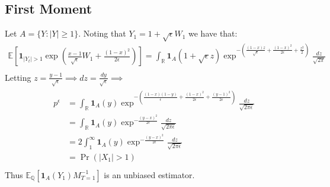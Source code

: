 \documentclass[11pt]{amsart}
\newcommand{\want}{p^{\epsilon}}
\newcommand{\noise}{\sqrt{\epsilon}}
\begin{document}
\subsection{First Moment}
Let $ A = \{ Y : |Y| \geq 1 \}$. Noting that $Y_1 = 1 + \sqrt{\epsilon}W_1$ we have that: 
\begin{align}
  \mathbb{E}\left [ \mathbf{1}_{ |Y_t| > 1 } \exp \left (
     \frac{x-1}{\noise} W_1 +\frac{(1-x)^2}{2\epsilon} \right ) \right ] =
   \int_{\mathbb{R}} \mathbf{1}_{A}(1+\sqrt{\epsilon}z)\exp^{-(\frac{(1-x)z}{\sqrt{\epsilon}}+\frac{(1-x)^2}{2\epsilon}+\frac{z^2}{2})} \frac{dz}{\sqrt{2\pi}} \\
\end{align}
Letting $z = \frac{y-1}{\sqrt{\epsilon}} \implies dz = \frac{dy}{\sqrt{\epsilon}} \implies $ 
\begin{align}
  \begin{split}
  \want &= \int_{\mathbb{R}} \mathbf{1}_{A}(y)\exp^{-(\frac{(1-x)(1-y)}{\epsilon}+\frac{(1-x)^2}{2\epsilon}+\frac{(y-1)^2}{2\epsilon})} \frac{dz}{\sqrt{2\pi\epsilon}} \\
  &= \int_{\mathbb{R}} \mathbf{1}_{A}(y)\exp^{-\frac{(y-x)^2}{2\epsilon}} \frac{dz}{\sqrt{2\pi\epsilon}} \\
  &= 2\int_{1}^{\infty} \mathbf{1}_{A}(y)\exp^{-\frac{(y-x)^2}{2\epsilon}} \frac{dz}{\sqrt{2\pi\epsilon}} \\
  &= \Pr( |X_1| > 1 ) \\
 \end{split}
\end{align}
Thus $\mathbb{E}_{\mathbb{Q}}[\mathbf{1}_{A}(Y_1) M_{T=1}^{-1}]$ is an unbiased estimator. 
\end{document}
